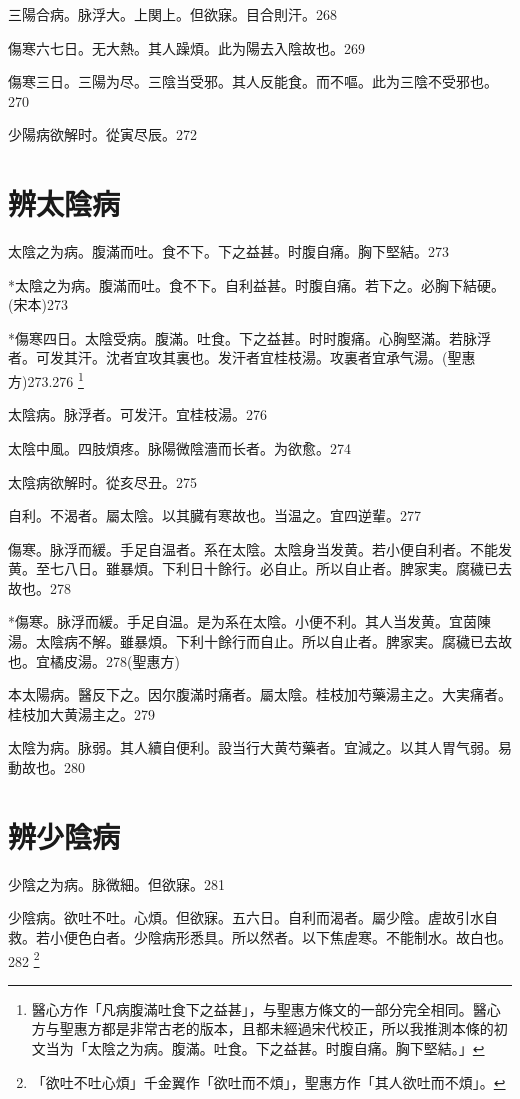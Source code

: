 \documentclass[b5paper,twoside,zihao=-4,UTF8]{ctexbook}
\begin{document}
三陽合病。脉浮大。上関上。但欲寐。目合則汗。268

傷寒六七日。无大熱。其人躁煩。此为陽去入陰故也。269

傷寒三日。三陽为尽。三陰当受邪。其人反能食。而不嘔。此为三陰不受邪也。270

少陽病欲解时。從寅尽辰。272

\chapter{辨太陰病}

太陰之为病。腹滿而吐。食不下。下之益甚。时腹自痛。胸下堅結。273

*太陰之为病。腹滿而吐。食不下。自利益甚。时腹自痛。若下之。必胸下結硬。(宋本)273

*傷寒四日。太陰受病。腹滿。吐食。下之益甚。时时腹痛。心胸堅滿。若脉浮者。可发其汗。沈者宜攻其裏也。发汗者宜桂枝湯。攻裏者宜承气湯。(聖惠方)273.276
	\footnote{醫心方作「凡病腹滿吐食下之益甚」，与聖惠方條文的一部分完全相同。醫心方与聖惠方都是非常古老的版本，且都未經過宋代校正，所以我推測本條的初文当为「太陰之为病。腹滿。吐食。下之益甚。时腹自痛。胸下堅結。」}

太陰病。脉浮者。可发汗。宜桂枝湯。276

太陰中風。四肢煩疼。{脉}陽微陰濇而长者。为欲愈。274

太陰病欲解时。從亥尽丑。275

自利。不渴者。屬太陰。以其臓有寒故也。当温之。宜四逆輩。277

傷寒。脉浮而緩。手足自温者。系在太陰。太陰{身}当发黄。若小便自利者。不能发黄。至七八日。雖暴煩。下利日十餘行。必自止。所以自止者。脾家実。腐穢已去故也。278

*傷寒。脉浮而緩。手足自温。是为系在太陰。小便不利。其人当发黄。宜茵陳湯。太陰病不解。雖暴煩。下利十餘行而自止。所以自止者。脾家実。腐穢已去故也。宜橘皮湯。278(聖惠方)

{本}太陽病。醫反下之。因尔腹滿时痛者。屬太陰。桂枝加芍藥湯主之。大実痛者。桂枝加大黄湯主之。279

太陰为病。脉弱。其人續自便利。設当行大黄芍藥者。宜減之。以其人胃气弱。易動故也。280

\chapter{辨少陰病}

少陰之为病。脉微細。但欲寐。281

少陰病。欲吐不吐。心煩。但欲寐。五六日。自利而渴者。屬少陰。虗故引水自救。若小便色白者。少陰病形悉具。所以然者。以下焦虗寒。不能制水。故白也。282
	\footnote{「欲吐不吐心煩」千金翼作「欲吐而不煩」，聖惠方作「其人欲吐而不煩」。}
\end{document}
